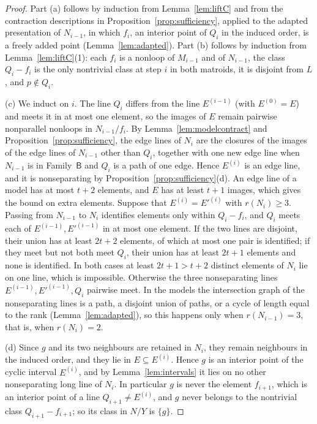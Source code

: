 \documentclass[11pt]{amsart}
\theoremstyle{definition}
\theoremstyle{remark}
\numberwithin{equation}{section}
\newcommand{\FB}{\mathsf{B}}
\begin{document}
\begin{proof}
Part (a) follows by induction from Lemma~\ref{lem:liftC} and from the contraction descriptions in Proposition~\ref{prop:sufficiency}, applied to the adapted presentation of $N_{i-1}$, in which $f_i$, an interior point of $Q_i$ in the induced order, is a freely added point (Lemma~\ref{lem:adapted}). Part (b) follows by induction from Lemma~\ref{lem:liftC}(1): each $f_i$ is a nonloop of $M_{i-1}$ and of $N_{i-1}$, the class $Q_i-f_i$ is the only nontrivial class at step $i$ in both matroids, it is disjoint from $L$, and $p\notin Q_i$.

(c) We induct on $i$. The line $Q_i$ differs from the line $E^{(i-1)}$ (with $E^{(0)}=E$) and meets it in at most one element, so the images of $E$ remain pairwise nonparallel nonloops in $N_{i-1}/f_i$. By Lemma~\ref{lem:modelcontract} and Proposition~\ref{prop:sufficiency}, the edge lines of $N_i$ are the closures of the images of the edge lines of $N_{i-1}$ other than $Q_i$, together with one new edge line when $N_{i-1}$ is in Family~$\FB$ and $Q_i$ is a path of one edge. Hence $E^{(i)}$ is an edge line, and it is nonseparating by Proposition~\ref{prop:sufficiency}(d). An edge line of a model has at most $t+2$ elements, and $E$ has at least $t+1$ images, which gives the bound on extra elements. Suppose that $E^{(i)}=E'^{(i)}$ with $r(N_i)\ge3$. Passing from $N_{i-1}$ to $N_i$ identifies elements only within $Q_i-f_i$, and $Q_i$ meets each of $E^{(i-1)},E'^{(i-1)}$ in at most one element. If the two lines are disjoint, their union has at least $2t+2$ elements, of which at most one pair is identified; if they meet but not both meet $Q_i$, their union has at least $2t+1$ elements and none is identified. In both cases at least $2t+1>t+2$ distinct elements of $N_i$ lie on one line, which is impossible. Otherwise the three nonseparating lines $E^{(i-1)},E'^{(i-1)},Q_i$ pairwise meet. In the models the intersection graph of the nonseparating lines is a path, a disjoint union of paths, or a cycle of length equal to the rank (Lemma~\ref{lem:adapted}), so this happens only when $r(N_{i-1})=3$, that is, when $r(N_i)=2$.

(d) Since $g$ and its two neighbours are retained in $N_i$, they remain neighbours in the induced order, and they lie in $E\subseteq E^{(i)}$. Hence $g$ is an interior point of the cyclic interval $E^{(i)}$, and by Lemma~\ref{lem:intervals} it lies on no other nonseparating long line of $N_i$. In particular $g$ is never the element $f_{i+1}$, which is an interior point of a line $Q_{i+1}\ne E^{(i)}$, and $g$ never belongs to the nontrivial class $Q_{i+1}-f_{i+1}$; so its class in $N/Y$ is $\{g\}$.
\end{proof}
\end{document}
